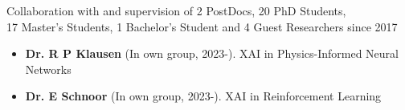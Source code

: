 
\newcommand{\supervision}[3]{\textbf{#1} (In own group, #2). {\small #3}}
\newcommand{\cosupervision}[4]{\textbf{#1} (#2, #3, co-supervision). {\small #4}}

\ifdefined\shortcv
    {
        \hspace*{\fill} Collaboration with and supervision of 2 PostDocs, 20 PhD Students,\\
        \hspace*{\fill} 17 Master's Students, 1 Bachelor's Student and 4 Guest Researchers since 2017
        }
\else
        {
            \begin{itemize}
                \item [] \supervision{Dr. R P Klausen}{2023-}{XAI in Physics-Informed Neural Networks}
                \item [] \supervision{Dr. E Schnoor}{2023-}{XAI in Reinforcement Learning}
            \end{itemize}
        }

